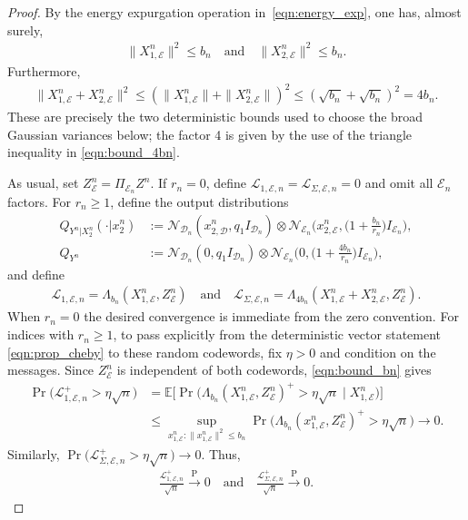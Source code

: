 \documentclass[11pt,onecolumn]{IEEEtran}
\newcommand{\nn}{\nonumber}
\newcommand{\calD}{\mathcal{D}}
\newcommand{\calE}{\mathcal{E}}
\newcommand{\calL}{\mathcal{L}}
\newcommand{\calN}{\mathcal{N}}
\newcommand{\rmP}{\mathrm{P}}
\newcommand{\bbE}{\mathbb{E}}
\begin{document}
\begin{proof}
    By the energy expurgation operation in~\eqref{eqn:energy_exp}, one has, almost surely,
    \begin{align}
        \|X_{1,\calE}^n\|^2\le b_n\quad\mbox{and}\quad\|X_{2,\calE}^n\|^2\le b_n. \label{eqn:bound_bn}
    \end{align}
    Furthermore,
    \begin{align}
        \|X_{1,\calE}^n+ X_{2,\calE}^n\|^2\le (  \|X_{1,\calE}^n \| + \|X_{2,\calE}^n \|)^2 \le (\sqrt{b_n}+\sqrt{b_n})^2=4b_n. \label{eqn:bound_4bn}
    \end{align}
    These are precisely the two deterministic bounds used to choose the broad Gaussian variances below; the factor 4 is given by the use of the triangle inequality in \eqref{eqn:bound_4bn}. 

    As usual, set $Z_\calE^n=\Pi_{\calE_n}Z^n$. If $r_n=0$, define $\calL_{1,\calE,n}=\calL_{\Sigma,\calE,n}=0$ and omit all $\calE_n$ factors. For $r_n\ge1$, define the output distributions
    \begin{align}
        Q_{Y^n|X_2^n}(\cdot|x_2^n) &:= \calN_{\calD_n}(x_{2,\calD}^n, q_1 I_{\calD_n})\otimes\calN_{\calE_n}\bigg(x_{2,\calE}^n, \Big(1+\frac{b_n}{r_n} \Big)I_{\calE_n}\bigg), \label{eqn:out1} \\
        Q_{Y^n}  &:= \calN_{\calD_n}(0, q_1 I_{\calD_n})\otimes\calN_{\calE_n}\bigg(0, \Big(1+\frac{4b_n}{r_n}\Big) I_{\calE_n}\bigg),\label{eqn:out_sum} 
    \end{align}
    and define 
    \begin{align}
       \calL_{1,\calE,n} =\Lambda_{b_n}(X_{1,\calE}^n, Z_{\calE}^n)\quad \mbox{and}\quad \calL_{\Sigma,\calE,n} =\Lambda_{4b_n}(X_{1,\calE}^n+X_{2,\calE}^n, Z_{\calE}^n).
    \end{align}
    When $r_n=0$ the desired convergence is immediate from the zero convention. For indices with $r_n\ge1$, to pass explicitly from the deterministic vector statement \eqref{eqn:prop_cheby} to these random codewords, fix $\eta>0$ and condition on the messages. Since $Z_\calE^n$ is independent of both codewords,  \eqref{eqn:bound_bn} gives
    \begin{align}
        \Pr\big(  \calL_{1,\calE,n}^+ >\eta\sqrt{n}\big) &=\bbE \Big[ \Pr\big(  \Lambda_{b_n}(X_{1,\calE}^n, Z_{\calE}^n)^+ >\eta\sqrt{n}\mid X_{1,\calE}^n\big) \Big] \nn\\
        &\le \sup_{ x_{1,\calE}^n:\| x_{1,\calE}^n \|^2\le b_n}  \Pr\big(  \Lambda_{b_n}(x_{1,\calE}^n, Z_{\calE}^n)^+ >\eta\sqrt{n}\big)\to0. \label{eqn:apply_cheby}
    \end{align}
    Similarly,  $\Pr\big(  \calL_{\Sigma,\calE,n}^+ >\eta\sqrt{n}\big)\to0$. Thus, 
    \begin{align}
        \frac{\calL_{1,\calE,n}^+ }{\sqrt{n}}\xrightarrow{\rmP}0\quad \mbox{and}\quad \frac{\calL_{\Sigma,\calE,n}^+ }{\sqrt{n}}\xrightarrow{\rmP}0. \label{eqn:Lplus}
    \end{align}


\end{proof}
\end{document}
